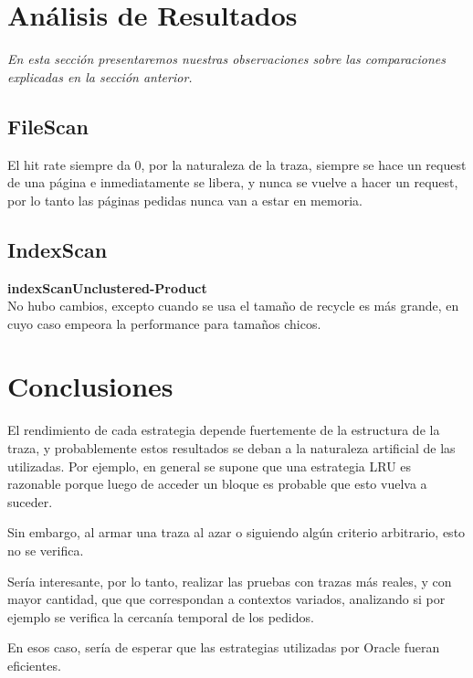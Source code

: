 \section{Análisis de Resultados}

\textsl{En esta secci\'on presentaremos nuestras observaciones
sobre las comparaciones explicadas en la secci\'on anterior.}

\vspace*{0.5cm}

\subsection{FileScan}

El hit rate siempre da 0, por la naturaleza de la traza, siempre se
hace un request de una página e inmediatamente se libera, y nunca 
se vuelve a hacer un request, por lo tanto las páginas pedidas
nunca van a estar en memoria.

\subsection{IndexScan}

\textbf{indexScanUnclustered-Product} \\

No hubo cambios, excepto cuando se usa el tamaño de recycle es más 
grande, en cuyo caso empeora la performance para tamaños chicos.




\section{Conclusiones}


El rendimiento de cada estrategia depende fuertemente de la 
estructura de la traza, y probablemente estos resultados se 
deban a la naturaleza artificial de las utilizadas. 
Por ejemplo, en general se supone que una estrategia LRU es
razonable porque luego de acceder un bloque es probable que 
esto vuelva a suceder. 

\vspace*{0.5cm}

Sin embargo, al armar una traza al azar o siguiendo algún 
criterio arbitrario, esto no se verifica.

\vspace*{0.5cm}

Sería interesante, por lo tanto, realizar las pruebas con 
trazas más reales, y con mayor cantidad, que que correspondan 
a contextos variados, analizando si por ejemplo se verifica la
cercanía temporal de los pedidos.

\vspace*{0.5cm}

En esos caso, sería de esperar que las estrategias utilizadas
por Oracle fueran eficientes.



